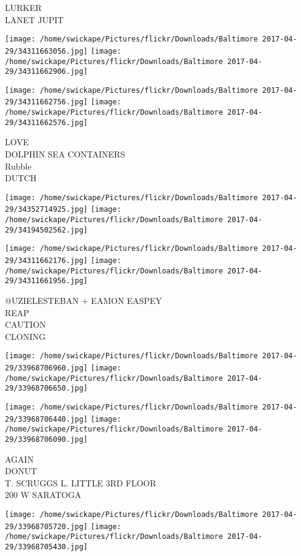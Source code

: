 \documentclass[10pt,letterpaper]{article}
\begin{document}
LURKER\\
LANET JUPIT\\
\pagebreak

\texttt{[image: /home/swickape/Pictures/flickr/Downloads/Baltimore 2017-04-29/34311663056.jpg]}
\texttt{[image: /home/swickape/Pictures/flickr/Downloads/Baltimore 2017-04-29/34311662906.jpg]}

\texttt{[image: /home/swickape/Pictures/flickr/Downloads/Baltimore 2017-04-29/34311662756.jpg]}
\texttt{[image: /home/swickape/Pictures/flickr/Downloads/Baltimore 2017-04-29/34311662576.jpg]}

LOVE\\
DOLPHIN SEA CONTAINERS\\
Rubble\\
DUTCH\\
\pagebreak

\texttt{[image: /home/swickape/Pictures/flickr/Downloads/Baltimore 2017-04-29/34352714925.jpg]}
\texttt{[image: /home/swickape/Pictures/flickr/Downloads/Baltimore 2017-04-29/34194502562.jpg]}

\texttt{[image: /home/swickape/Pictures/flickr/Downloads/Baltimore 2017-04-29/34311662176.jpg]}
\texttt{[image: /home/swickape/Pictures/flickr/Downloads/Baltimore 2017-04-29/34311661956.jpg]}

@UZIELESTEBAN + EAMON EASPEY\\
REAP\\
CAUTION\\
CLONING\\
\pagebreak

\texttt{[image: /home/swickape/Pictures/flickr/Downloads/Baltimore 2017-04-29/33968706960.jpg]}
\texttt{[image: /home/swickape/Pictures/flickr/Downloads/Baltimore 2017-04-29/33968706650.jpg]}

\texttt{[image: /home/swickape/Pictures/flickr/Downloads/Baltimore 2017-04-29/33968706440.jpg]}
\texttt{[image: /home/swickape/Pictures/flickr/Downloads/Baltimore 2017-04-29/33968706090.jpg]}

AGAIN\\
DONUT\\
T. SCRUGGS L. LITTLE 3RD FLOOR\\
200 W SARATOGA\\
\pagebreak

\texttt{[image: /home/swickape/Pictures/flickr/Downloads/Baltimore 2017-04-29/33968705720.jpg]}
\texttt{[image: /home/swickape/Pictures/flickr/Downloads/Baltimore 2017-04-29/33968705430.jpg]}
\end{document}

